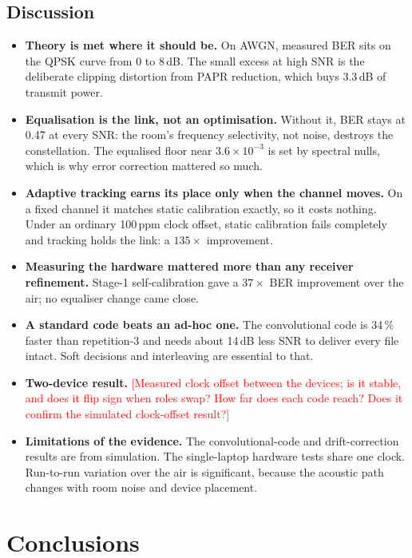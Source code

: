 \documentclass[11pt,a4paper]{report}
\newcommand{\fillin}[1]{\textcolor{red}{[#1]}}
\begin{document}
\section{Discussion}
\begin{itemize}
    \item \textbf{Theory is met where it should be.} On AWGN, measured BER sits on the
    QPSK curve from 0 to 8\,dB. The small excess at high SNR is the deliberate clipping
    distortion from PAPR reduction, which buys 3.3\,dB of transmit power.
    \item \textbf{Equalisation is the link, not an optimisation.} Without it, BER stays
    at 0.47 at every SNR: the room's frequency selectivity, not noise, destroys the
    constellation. The equalised floor near $3.6\times10^{-3}$ is set by spectral nulls,
    which is why error correction mattered so much.
    \item \textbf{Adaptive tracking earns its place only when the channel moves.} On a
    fixed channel it matches static calibration exactly, so it costs nothing. Under an
    ordinary 100\,ppm clock offset, static calibration fails completely and tracking
    holds the link: a $135\times$ improvement.
    \item \textbf{Measuring the hardware mattered more than any receiver refinement.}
    Stage-1 self-calibration gave a $37\times$ BER improvement over the air; no
    equaliser change came close.
    \item \textbf{A standard code beats an ad-hoc one.} The convolutional code is 34\,\%
    faster than repetition-3 and needs about 14\,dB less SNR to deliver every file
    intact. Soft decisions and interleaving are essential to that.
    \item \textbf{Two-device result.} \fillin{Measured clock offset between the devices;
    is it stable, and does it flip sign when roles swap? How far does each code reach?
    Does it confirm the simulated clock-offset result?}
    \item \textbf{Limitations of the evidence.} The convolutional-code and drift-correction
    results are from simulation. The single-laptop hardware tests share one clock. Run-to-run
    variation over the air is significant, because the acoustic path changes with room
    noise and device placement.
\end{itemize}

\chapter{Conclusions}
\end{document}
